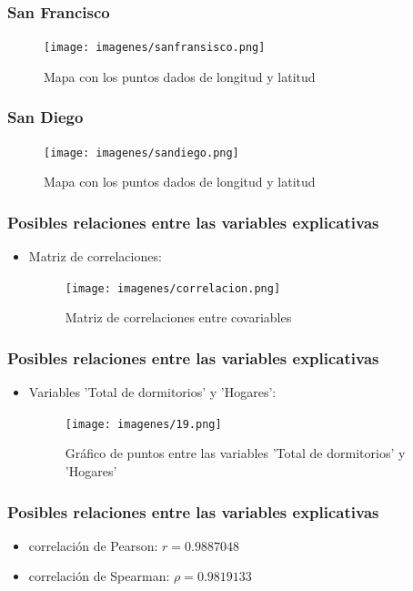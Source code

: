 \documentclass[12pt]{beamer}
\begin{document}
\begin{frame}
\frametitle{San Francisco}
\begin{figure}[!h]
    \begin{center}
        \texttt{[image: imagenes/sanfransisco.png]}
        \caption{Mapa con los puntos dados de longitud y latitud}
        \label{fig:Densidad}
    \end{center}
\end{figure}
\end{frame}

\begin{frame}
\frametitle{San Diego}
\begin{figure}[!h]
    \begin{center}
        \texttt{[image: imagenes/sandiego.png]}
        \caption{Mapa con los puntos dados de longitud y latitud}
        \label{fig:Densidad}
    \end{center}
\end{figure}
\end{frame}

\begin{frame}
\frametitle{Posibles relaciones entre las variables explicativas}
\begin{itemize}
\item Matriz de correlaciones:
\begin{figure}[!h]
       \raggedright
        \texttt{[image: imagenes/correlacion.png]}
        \caption{Matriz de correlaciones entre covariables }
        \label{fig:Densidad}
\end{figure}
\end{itemize}
\end{frame}

\begin{frame}
\frametitle{Posibles relaciones entre las variables explicativas}
\begin{itemize}
\item Variables 'Total de dormitorios' y 'Hogares':
\begin{figure}[!h]
    \begin{center}
        \texttt{[image: imagenes/19.png]}
        \caption{Gráfico de puntos entre las variables 'Total de dormitorios' y 'Hogares'}
        \label{fig:Densidad}
    \end{center}
\end{figure}
\end{itemize}
\end{frame}

\begin{frame}
\frametitle{Posibles relaciones entre las variables explicativas}
\begin{itemize}
\item correlación de Pearson: $r=0.9887048$
\item correlación de Spearman: $\rho=0.9819133$
\end{itemize}
\end{frame}
\end{document}
